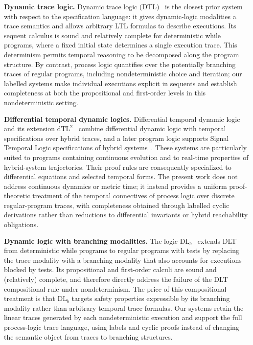 \documentclass[manuscript,screen]{acmart}
\begin{document}
\textbf{Dynamic trace logic.}
Dynamic trace logic (DTL)~\cite{Beckert13} is the closest prior system with respect to the specification language: it gives dynamic-logic modalities a trace semantics and allows arbitrary LTL formulas to describe executions.
Its sequent calculus is sound and relatively complete for deterministic while programs, where a fixed initial state determines a single execution trace.
This determinism permits temporal reasoning to be decomposed along the program structure.
By contrast, process logic quantifies over the potentially branching traces of regular programs, including nondeterministic choice and iteration; our labelled systems make individual executions explicit in sequents and establish completeness at both the propositional and first-order levels in this nondeterministic setting.

\textbf{Differential temporal dynamic logics.}
Differential temporal dynamic logic and its extension $\mathrm{dTL}^{2}$~\cite{PlatzersTDL,DTL2} combine differential dynamic logic with temporal specifications over hybrid traces, and a later program logic supports Signal Temporal Logic specifications of hybrid systems~\cite{Ahmad21}.
These systems are particularly suited to programs containing continuous evolution and to real-time properties of hybrid-system trajectories.
Their proof rules are consequently specialized to differential equations and selected temporal forms.
The present work does not address continuous dynamics or metric time; it instead provides a uniform proof-theoretic treatment of the temporal connectives of process logic over discrete regular-program traces, with completeness obtained through labelled cyclic derivations rather than reductions to differential invariants or hybrid reachability obligations.

\textbf{Dynamic logic with branching modalities.}
The logic $\mathrm{DL}_{b}$~\cite{Zhang24} extends DLT from deterministic while programs to regular programs with tests by replacing the trace modality with a branching modality that also accounts for executions blocked by tests.
Its propositional and first-order calculi are sound and (relatively) complete, and therefore directly address the failure of the DLT compositional rule under nondeterminism.
The price of this compositional treatment is that $\mathrm{DL}_{b}$ targets safety properties expressible by its branching modality rather than arbitrary temporal trace formulas.
Our systems retain the linear traces generated by each nondeterministic execution and support the full process-logic trace language, using labels and cyclic proofs instead of changing the semantic object from traces to branching structures.
\end{document}
